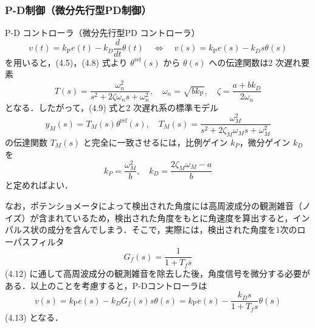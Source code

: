\subsubsection{P-D制御（微分先行型PD制御）}
P-D コントローラ（微分先行型PD コントローラ）
\begin{equation}
  v(t) = k_{\mathrm{P}} e(t) - k_D \frac{d}{dt} \theta(t) \quad \Longleftrightarrow \quad v(s) = k_{\mathrm{P}} e(s) - k_D s \theta(s)
\end{equation}
を用いると，(4.5)，(4.8) 式より $\theta^{\text{ref}}(s)$ から $\theta(s)$ への伝達関数は2 次遅れ要素
\begin{equation}
  T(s) = \frac{\omega_n^2}{s^2 + 2 \zeta \omega_n s + \omega_n^2}, \quad \omega_n = \sqrt{b k_{\mathrm{P}}}, \quad \zeta = \frac{a + b k_D}{2 \omega_n}
\end{equation}
となる．したがって，(4.9) 式と2 次遅れ系の標準モデル
\begin{equation}
  y_M(s) = T_M(s) \theta^{\text{ref}}(s), \quad T_M(s) = \frac{\omega_M^2}{s^2 + 2 \zeta_M \omega_M s + \omega_M^2}
\end{equation}
の伝達関数 $T_M(s)$ と完全に一致させるには，比例ゲイン $k_P$，微分ゲイン $k_D$ を
\begin{equation}
  k_P = \frac{\omega_M^2}{b}, \quad k_D = \frac{2 \zeta_M \omega_M - a}{b}
\end{equation}
と定めればよい．

なお，ポテンショメータによって検出された角度には高周波成分の観測雑音（ノイズ）が含まれているため，検出された角度をもとに角速度を算出すると，インパルス状の成分を含んでしまう．そこで，実際には，検出された角度を1次のローパスフィルタ
\begin{equation}
  G_f(s) = \frac{1}{1 + T_f s}
\end{equation}
(4.12)
に通して高周波成分の観測雑音を除去した後，角度信号を微分する必要がある．以上のことを考慮すると，P-Dコントローラは
\begin{equation}
  v(s) = k_{\mathrm{P}} e(s) - k_D G_f(s) s \theta(s) = k_{\mathrm{P}} e(s) - \frac{k_D s}{1 + T_f s} \theta(s)
\end{equation}
(4.13)
となる．

